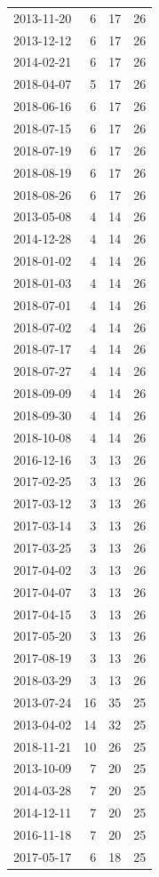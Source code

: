 \begin{tabular}{lrrr}
2013-11-20 & 6 & 17 & 26 \\
2013-12-12 & 6 & 17 & 26 \\
2014-02-21 & 6 & 17 & 26 \\
2018-04-07 & 5 & 17 & 26 \\
2018-06-16 & 6 & 17 & 26 \\
2018-07-15 & 6 & 17 & 26 \\
2018-07-19 & 6 & 17 & 26 \\
2018-08-19 & 6 & 17 & 26 \\
2018-08-26 & 6 & 17 & 26 \\
2013-05-08 & 4 & 14 & 26 \\
2014-12-28 & 4 & 14 & 26 \\
2018-01-02 & 4 & 14 & 26 \\
2018-01-03 & 4 & 14 & 26 \\
2018-07-01 & 4 & 14 & 26 \\
2018-07-02 & 4 & 14 & 26 \\
2018-07-17 & 4 & 14 & 26 \\
2018-07-27 & 4 & 14 & 26 \\
2018-09-09 & 4 & 14 & 26 \\
2018-09-30 & 4 & 14 & 26 \\
2018-10-08 & 4 & 14 & 26 \\
2016-12-16 & 3 & 13 & 26 \\
2017-02-25 & 3 & 13 & 26 \\
2017-03-12 & 3 & 13 & 26 \\
2017-03-14 & 3 & 13 & 26 \\
2017-03-25 & 3 & 13 & 26 \\
2017-04-02 & 3 & 13 & 26 \\
2017-04-07 & 3 & 13 & 26 \\
2017-04-15 & 3 & 13 & 26 \\
2017-05-20 & 3 & 13 & 26 \\
2017-08-19 & 3 & 13 & 26 \\
2018-03-29 & 3 & 13 & 26 \\
2013-07-24 & 16 & 35 & 25 \\
2013-04-02 & 14 & 32 & 25 \\
2018-11-21 & 10 & 26 & 25 \\
2013-10-09 & 7 & 20 & 25 \\
2014-03-28 & 7 & 20 & 25 \\
2014-12-11 & 7 & 20 & 25 \\
2016-11-18 & 7 & 20 & 25 \\
2017-05-17 & 6 & 18 & 25 \\

\end{tabular}

